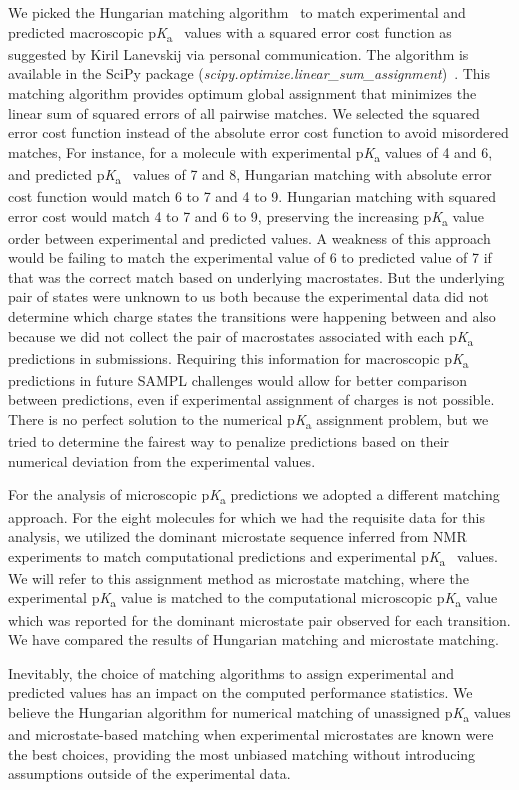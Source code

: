 \documentclass[9pt,lineno,final]{elife}
\newcommand{\pKa}{p\textit{K}\textsubscript{a}}
\begin{document}
We picked the Hungarian matching algorithm~\citep{Kuhn:1955:Nav.Res.Logist.Q., Munkres:1957:JSIAM} to match experimental and predicted macroscopic \pKa{}~ values with a squared error cost function as suggested by Kiril Lanevskij via personal communication. 
The algorithm is available in the SciPy package (\textit{scipy.optimize.linear\_sum\_assignment})~\citep{SciPy-linear-sum-assignment}.
This matching algorithm provides optimum global assignment that minimizes the linear sum of squared errors of all pairwise matches.
We selected the squared error cost function instead of the absolute error cost function to avoid misordered matches,
For instance, for a molecule with experimental \pKa{} values of 4 and 6, and predicted \pKa{}~ values of 7 and 8, Hungarian matching with absolute error cost function would match 6 to 7 and 4 to 9.
Hungarian matching with squared error cost would match 4 to 7 and 6 to 9, preserving the increasing \pKa{} value order between experimental and predicted values.
A weakness of this approach would be failing to match the experimental value of 6 to predicted value of 7 if that was the correct match based on underlying macrostates. 
But the underlying pair of states were unknown to us both because the experimental data did not determine which charge states the transitions were happening between and also because we did not collect the pair of macrostates associated with each \pKa{} predictions in submissions. 
Requiring this information for macroscopic \pKa{} predictions in future SAMPL challenges would allow for better comparison between predictions, even if experimental assignment of charges is not possible.
There is no perfect solution to the numerical \pKa{} assignment problem, but we tried to determine the fairest way to penalize predictions based on their numerical deviation from the experimental values.

For the analysis of microscopic \pKa{} predictions we adopted a different matching approach. 
For the eight molecules for which we had the requisite data for this analysis, we utilized the dominant microstate sequence inferred from NMR experiments to match computational predictions and experimental \pKa{}~ values. 
We will refer to this assignment method as microstate matching, where the experimental \pKa{} value is matched to the computational microscopic \pKa{} value which was reported for the dominant microstate pair observed for each transition. 
We have compared the results of Hungarian matching and microstate matching. 

Inevitably, the choice of matching algorithms to assign experimental and predicted values has an impact on the computed performance statistics. 
We believe the Hungarian algorithm for numerical matching of unassigned \pKa{} values and microstate-based matching when experimental microstates are known were the best choices, providing the most unbiased matching without introducing assumptions outside of the experimental data.
\end{document}
